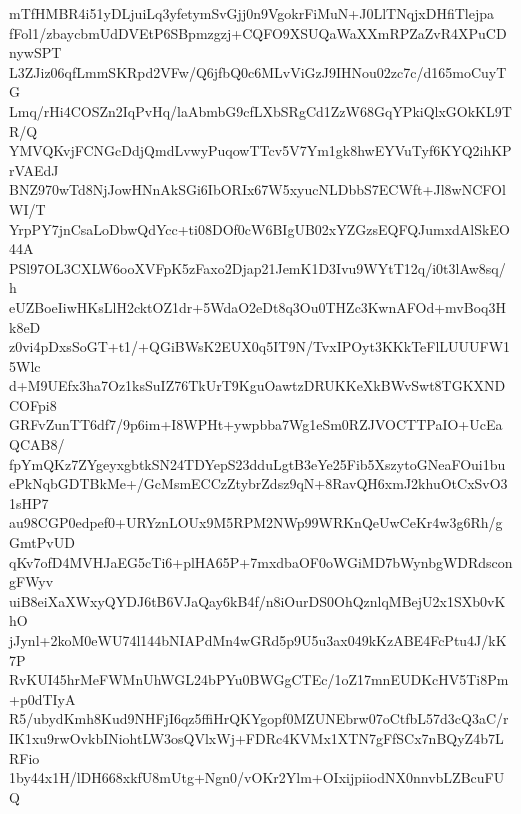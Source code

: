 mTfHMBR4i51yDLjuiLq3yfetymSvGjj0n9VgokrFiMuN+J0LlTNqjxDHfiTlejpa
fFol1/zbaycbmUdDVEtP6SBpmzgzj+CQFO9XSUQaWaXXmRPZaZvR4XPuCDnywSPT
L3ZJiz06qfLmmSKRpd2VFw/Q6jfbQ0c6MLvViGzJ9IHNou02zc7c/d165moCuyTG
Lmq/rHi4COSZn2IqPvHq/laAbmbG9cfLXbSRgCd1ZzW68GqYPkiQlxGOkKL9TR/Q
YMVQKvjFCNGcDdjQmdLvwyPuqowTTcv5V7Ym1gk8hwEYVuTyf6KYQ2ihKPrVAEdJ
BNZ970wTd8NjJowHNnAkSGi6IbORIx67W5xyucNLDbbS7ECWft+Jl8wNCFOlWI/T
YrpPY7jnCsaLoDbwQdYcc+ti08DOf0cW6BIgUB02xYZGzsEQFQJumxdAlSkEO44A
PSl97OL3CXLW6ooXVFpK5zFaxo2Djap21JemK1D3Ivu9WYtT12q/i0t3lAw8sq/h
eUZBoeIiwHKsLlH2cktOZ1dr+5WdaO2eDt8q3Ou0THZc3KwnAFOd+mvBoq3Hk8eD
z0vi4pDxsSoGT+t1/+QGiBWsK2EUX0q5IT9N/TvxIPOyt3KKkTeFlLUUUFW15Wlc
d+M9UEfx3ha7Oz1ksSuIZ76TkUrT9KguOawtzDRUKKeXkBWvSwt8TGKXNDCOFpi8
GRFvZunTT6df7/9p6im+I8WPHt+ywpbba7Wg1eSm0RZJVOCTTPaIO+UcEaQCAB8/
fpYmQKz7ZYgeyxgbtkSN24TDYepS23dduLgtB3eYe25Fib5XszytoGNeaFOui1bu
ePkNqbGDTBkMe+/GcMsmECCzZtybrZdsz9qN+8RavQH6xmJ2khuOtCxSvO31sHP7
au98CGP0edpef0+URYznLOUx9M5RPM2NWp99WRKnQeUwCeKr4w3g6Rh/gGmtPvUD
qKv7ofD4MVHJaEG5cTi6+plHA65P+7mxdbaOF0oWGiMD7bWynbgWDRdscongFWyv
uiB8eiXaXWxyQYDJ6tB6VJaQay6kB4f/n8iOurDS0OhQznlqMBejU2x1SXb0vKhO
jJynl+2koM0eWU74l144bNIAPdMn4wGRd5p9U5u3ax049kKzABE4FcPtu4J/kK7P
RvKUI45hrMeFWMnUhWGL24bPYu0BWGgCTEc/1oZ17mnEUDKcHV5Ti8Pm+p0dTIyA
R5/ubydKmh8Kud9NHFjI6qz5ffiHrQKYgopf0MZUNEbrw07oCtfbL57d3cQ3aC/r
IK1xu9rwOvkbINiohtLW3osQVlxWj+FDRc4KVMx1XTN7gFfSCx7nBQyZ4b7LRFio
1by44x1H/lDH668xkfU8mUtg+Ngn0/vOKr2Ylm+OIxijpiiodNX0nnvbLZBcuFUQ
